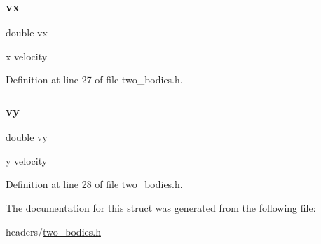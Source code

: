 \subsubsection{\texorpdfstring{vx}{vx}}
{\footnotesize\ttfamily double vx}

x velocity 

Definition at line 27 of file two\+\_\+bodies.\+h.

\mbox{\label{struct__body_a42e75115788e629a258d041808d822a0}} 
\subsubsection{\texorpdfstring{vy}{vy}}
{\footnotesize\ttfamily double vy}

y velocity 

Definition at line 28 of file two\+\_\+bodies.\+h.



The documentation for this struct was generated from the following file\+:\begin{DoxyCompactItemize}
\item 
headers/\hyperlink{two__bodies_8h}{two\+\_\+bodies.\+h}\end{DoxyCompactItemize}
